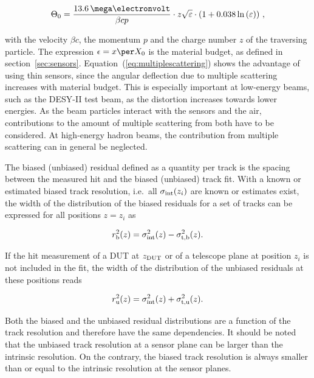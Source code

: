 \begin{equation}
\label{eq:multiplescattering}
\Theta_{0} = \frac{13.6\,\mega\electronvolt}{\beta c p} \cdot z
\sqrt{\varepsilon}
\cdot \left( 1 + 0.038 \ln{\left( \varepsilon \right) } \right) \,,
\end{equation}

\noindent with the velocity $\beta c$, the momentum $p$ and the charge number $z$ of the traversing particle. 
The expression $\epsilon = x \per X_0$ is the material budget, as defined in section~\ref{sec:sensors}.
%
Equation~(\ref{eq:multiplescattering}) shows the advantage of using thin sensors, since the angular deflection due to multiple scattering increases with material budget.
This is especially important at low-energy beams, such as the DESY-II test beam, as the distortion increases towards lower energies.
As the beam particles interact with the sensors and the air, contributions to the amount of multiple scattering from both have to be considered.
At high-energy hadron beams, the contribution from multiple scattering can in general be neglected. 
 
The biased (unbiased) residual defined as a quantity per track is the spacing between the measured hit and the biased (unbiased) track fit. 
With a known or estimated biased track resolution, i.e.\ all $\sigma_{\textrm{int}}(z_i)$ are known or estimates exist,
 the width of the distribution of the biased residuals for a set of tracks can be expressed for all positions $z = z_i$ as

\begin{equation}
 \label{eq:telescoperesolutionequation1}
 r_{\textrm{b}}^2(z) = \sigma_{\textrm{int}}^2(z) - \sigma_{\textrm{t,b}}^2(z).
\end{equation}

\noindent
If the hit measurement of a DUT at $z_{\textrm{DUT}}$ or of a telescope plane at position $z_i$ is not included in the fit,
 the width of the distribution of the unbiased residuals at these positions reads~\cite{ref:eudetreport200902}
 
\begin{equation}
r_{\textrm{u}}^2(z) = \sigma_{\textrm{int}}^2(z) + \sigma_{\textrm{t,u}}^2(z).
\label{eq:telescoperesolutionequation2} 
\end{equation}

\noindent
Both the biased and the unbiased residual distributions are a function of the track resolution and therefore have the same dependencies.
It should be noted that the unbiased track resolution at a sensor plane can be larger than the intrinsic resolution. 
On the contrary, the biased track resolution is always smaller than or equal to the intrinsic resolution at the sensor planes. 

